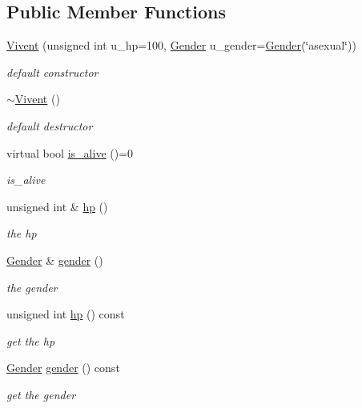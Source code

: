 \subsection*{Public Member Functions}
\begin{DoxyCompactItemize}
\item 
\hyperlink{classVivent_a72647b9b0f4fe83f8f7360a6ed6e0ca7}{Vivent} (unsigned int u\_\-hp=100, \hyperlink{classGender}{Gender} u\_\-gender=\hyperlink{classGender}{Gender}(\char`\"{}asexual\char`\"{}))
\begin{DoxyCompactList}\small\item\em default constructor \end{DoxyCompactList}\item 
\hyperlink{classVivent_ac926725fd801a82fee9f960ff96386bf}{$\sim$Vivent} ()
\begin{DoxyCompactList}\small\item\em default destructor \end{DoxyCompactList}\item 
virtual bool \hyperlink{classVivent_a253291090ae6207f8f51f8ff669d9d17}{is\_\-alive} ()=0
\begin{DoxyCompactList}\small\item\em is\_\-alive \end{DoxyCompactList}\item 
unsigned int \& \hyperlink{classVivent_a5649888ad4779d5294fe7a6f57e4ecd4}{hp} ()
\begin{DoxyCompactList}\small\item\em the hp \end{DoxyCompactList}\item 
\hyperlink{classGender}{Gender} \& \hyperlink{classVivent_a83a8f9dd53a46f84ac01f3f262b7f6f4}{gender} ()
\begin{DoxyCompactList}\small\item\em the gender \end{DoxyCompactList}\item 
\hypertarget{classVivent_ad55d988e84cd95d0847a374a2102ee89}{
unsigned int \hyperlink{classVivent_ad55d988e84cd95d0847a374a2102ee89}{hp} () const }
\label{classVivent_ad55d988e84cd95d0847a374a2102ee89}

\begin{DoxyCompactList}\small\item\em get the hp \end{DoxyCompactList}\item 
\hypertarget{classVivent_a60975c27c18684b46e5fa2e1810c53ae}{
\hyperlink{classGender}{Gender} \hyperlink{classVivent_a60975c27c18684b46e5fa2e1810c53ae}{gender} () const }
\label{classVivent_a60975c27c18684b46e5fa2e1810c53ae}

\begin{DoxyCompactList}\small\item\em get the gender \end{DoxyCompactList}\end{DoxyCompactItemize}
